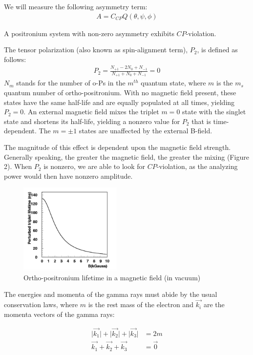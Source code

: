 We will measure the following asymmetry term:
\begin{align}
A=C_{CP}Q(\theta,\psi,\phi)
\end{align}

A positronium system with non-zero asymmetry exhibits $CP$-violation.

The tensor polarization (also known as spin-alignment term), $P_{2}$, is defined as follows:
 \begin{align}
 P_{2}=\frac{N_{+1}-2N_{0}+N_{-1}}{N_{+1}+N_{0}+N_{-1}}=0
 \end{align}
$N_{m}$ stands for the number of o-Ps in the $m^{th}$ quantum state, where $m$ is the $m_{s}$ quantum number of ortho-positronium. With no magnetic field present, these states have the same half-life and are equally populated at all times, yielding $P_{2}=0$. An external magnetic field mixes the triplet $m=0$ state with the singlet state and shortens its half-life, yielding a nonzero value for $P_{2}$ that is time-dependent. The $m={\pm}1$ states are unaffected by the external B-field.

 The magnitude of this effect is dependent upon the magnetic field strength. Generally speaking, the greater the magnetic field, the greater the mixing (Figure 2). When $P_{2}$ is nonzero, we are able to look for $CP$-violation, as the analyzing power would then have nonzero amplitude.


 \begin{figure}[H]
 \includegraphics[width=0.45\textwidth,center]{Lifetime_BField.pdf}
 \caption{Ortho-positronium lifetime in a magnetic field (in vacuum)~\cite{Felcini:2004yn}}
 \end{figure}

 The energies and momenta of the gamma rays must abide by the usual conservation laws, where $m$ is the rest mass of the electron and $\vec{k_{i}}$ are the momenta vectors of the gamma rays:

 \begin{align}
 {\lvert}\vec{k_{1}}{\rvert}+{\lvert}\vec{k_{2}}{\rvert}+{\lvert}\vec{k_{3}}{\rvert}&=2m \\
 \vec{k_{1}}+\vec{k_{2}}+\vec{k_{3}}&=\vec{0} 
 \end{align}

